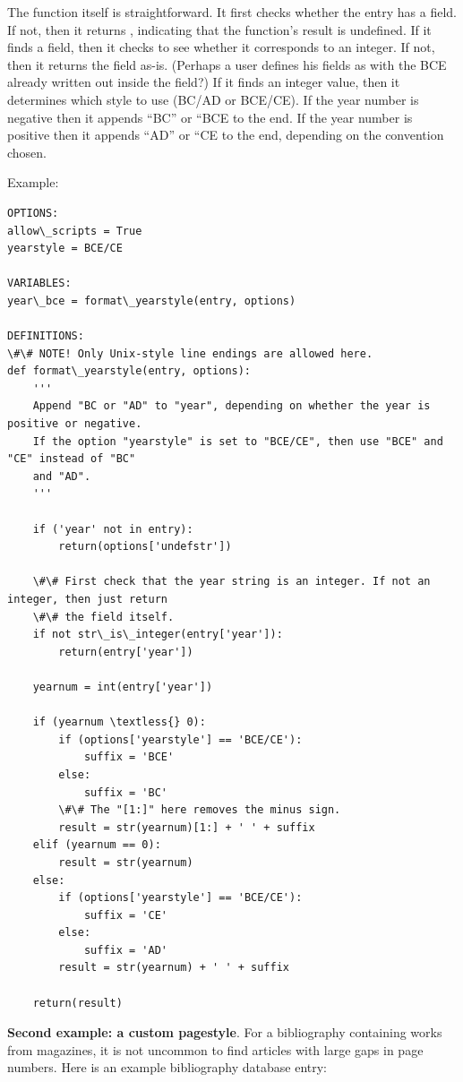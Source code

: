 \documentclass[letterpaper,10pt,english]{sphinxmanual}
\begin{document}
The  function itself is straightforward. It first checks whether the entry has a  field. If not, then it returns , indicating that the function's result is undefined. If it finds a  field, then it checks to see whether it corresponds to an integer. If not, then it returns the field as-is. (Perhaps a user defines his  fields as  with the BCE already written out inside the field?) If it finds an integer value, then it determines which style to use (BC/AD or BCE/CE). If the year number is negative then it appends ``BC'' or ``BCE to the end. If the year number is positive then it appends ``AD'' or ``CE to the end, depending on the convention chosen.

Example:

\begin{Verbatim}[commandchars=\\\{\}]
OPTIONS:
allow\_scripts = True
yearstyle = BCE/CE

VARIABLES:
year\_bce = format\_yearstyle(entry, options)

DEFINITIONS:
\#\# NOTE! Only Unix-style line endings are allowed here.
def format\_yearstyle(entry, options):
    '''
    Append "BC or "AD" to "year", depending on whether the year is positive or negative.
    If the option "yearstyle" is set to "BCE/CE", then use "BCE" and "CE" instead of "BC"
    and "AD".
    '''

    if ('year' not in entry):
        return(options['undefstr'])

    \#\# First check that the year string is an integer. If not an integer, then just return
    \#\# the field itself.
    if not str\_is\_integer(entry['year']):
        return(entry['year'])

    yearnum = int(entry['year'])

    if (yearnum \textless{} 0):
        if (options['yearstyle'] == 'BCE/CE'):
            suffix = 'BCE'
        else:
            suffix = 'BC'
        \#\# The "[1:]" here removes the minus sign.
        result = str(yearnum)[1:] + ' ' + suffix
    elif (yearnum == 0):
        result = str(yearnum)
    else:
        if (options['yearstyle'] == 'BCE/CE'):
            suffix = 'CE'
        else:
            suffix = 'AD'
        result = str(yearnum) + ' ' + suffix

    return(result)
\end{Verbatim}

\textbf{Second example: a custom pagestyle}. For a bibliography containing works from magazines, it is not uncommon to find articles with large gaps in page numbers. Here is an example bibliography database entry:
\end{document}
